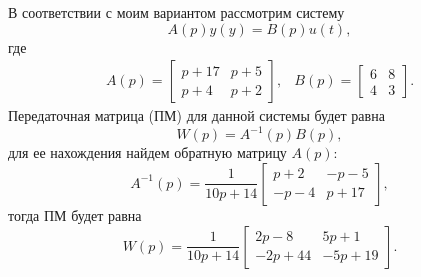 В соответствии с моим вариантом рассмотрим систему
\begin{equation*}
    A(p)y(y)=B(p)u(t),
\end{equation*}
где
\begin{equation*}
    \begin{array}{cc}
        A(p)=\begin{bmatrix}
            p+17&p+5\\
            p+4&p+2
        \end{bmatrix}, &
        B(p)=\begin{bmatrix}
            6&8\\4&3
        \end{bmatrix}.        
    \end{array}
\end{equation*}
Передаточная матрица (ПМ) для данной системы будет равна
\begin{equation*}
    W(p)=A^{-1}(p)B(p),
\end{equation*}
для ее нахождения найдем обратную матрицу $A(p)$:
\begin{equation*}
    A^{-1}(p)=\frac{1}{10p+14}\begin{bmatrix}
        p+2&-p-5\\-p-4&p+17
    \end{bmatrix},
\end{equation*}
тогда ПМ будет равна
\begin{equation*}
    W(p)=\frac{1}{10p+14}\begin{bmatrix}
        2p-8&5p+1\\-2p+44&-5p+19
    \end{bmatrix}.
\end{equation*}
